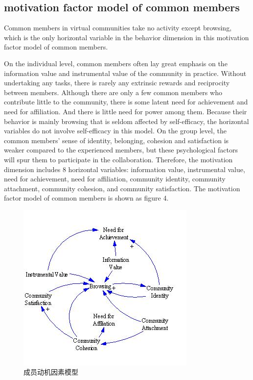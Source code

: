 \documentclass{elsarticle}
\begin{document}
\subsection{motivation factor model of common members}
\label{sec:motiv-fact-model-1}

Common members in virtual communities take no activity except browsing, which is the only horizontal variable in the behavior dimension in this motivation factor model of common members. 

On the individual level, common members often lay great emphasis on
the information value and instrumental value of the community in
practice. Without undertaking any tasks, there is rarely any extrinsic
rewards and reciprocity between members. Although there are only a few
common members who contribute little to the community, there is some
latent need for achievement and need for affiliation. And there is
little need for power among them. Because their behavior is mainly
browsing that is seldom affected by self-efficacy, the horizontal
variables do not involve self-efficacy in this model. On the group
level, the common members’ sense of identity, belonging, cohesion and
satisfaction is weaker compared to the experienced members, but these
psychological factors will spur them to participate in the
collaboration. Therefore, the motivation dimension includes 8
horizontal variables: information value, instrumental value, need for
achievement, need for affiliation, community identity, community
attachment, community cohesion, and community satisfaction. The
motivation factor model of common members is shown as figure 4.  
\begin{figure}[htpb]
  \centering
  \label{fig:common-member}
  \includegraphics{04}
  \caption{成员动机因素模型}
\end{figure}
\end{document}
